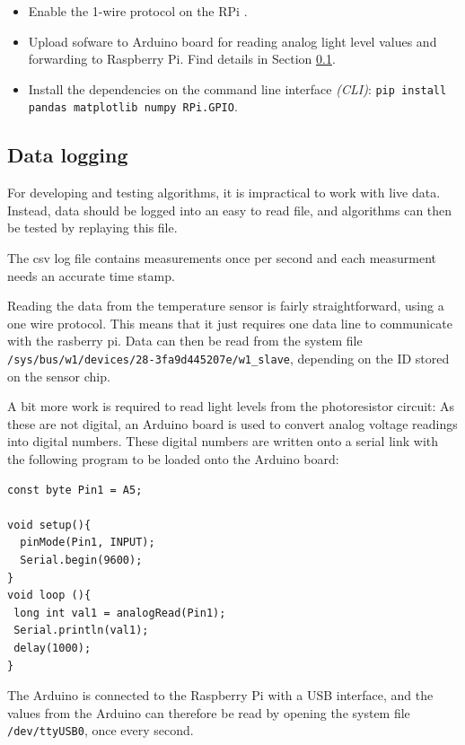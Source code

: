 \documentclass[a4paper,12pt]{article}
\begin{document}
\begin{itemize}
    \item Enable the 1-wire protocol on the RPi \cite{url:1wire}.
    \item Upload sofware to Arduino board for reading analog light level values and forwarding to Raspberry Pi. Find details in Section \ref{sec:datalogging}.
    \item Install the dependencies on the command line interface \emph{(CLI)}: \newline \verb|pip install pandas matplotlib numpy RPi.GPIO|.
\end{itemize}

\subsection{Data logging}
\label{sec:datalogging}

For developing and testing algorithms, it is impractical to work with live data. 
Instead, data should be logged into an easy to read file, and algorithms can then be tested by replaying this file.

The csv log file contains measurements once per second and each measurment needs an accurate time stamp.

Reading the data from the temperature sensor is fairly straightforward, using a one wire protocol\cite{url:digitalTempSensor}. 
This means that it just requires one data line to communicate with the rasberry pi.
Data can then be read from the system file \verb*|/sys/bus/w1/devices/28-3fa9d445207e/w1_slave|, depending on the ID stored on the sensor chip.

A bit more work is required to read light levels from the photoresistor circuit: As these are not digital, an Arduino board is used to convert analog
voltage readings into digital numbers. These digital numbers are written onto a serial link with the following program to be loaded onto the
Arduino board: 

\begin{verbatim}
const byte Pin1 = A5;

void setup(){
  pinMode(Pin1, INPUT);
  Serial.begin(9600);
}
void loop (){
 long int val1 = analogRead(Pin1);
 Serial.println(val1);
 delay(1000);
}

\end{verbatim}

The Arduino is connected to the Raspberry Pi with a USB interface, and the values from the Arduino can
therefore be read by opening the system file \verb|/dev/ttyUSB0|, once every second.
\end{document}
